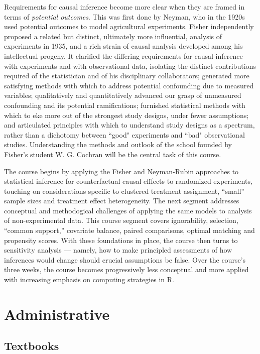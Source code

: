 \documentclass[12pt]{article}
\begin{document}
Requirements for causal inference become more clear when they are framed in terms of \emph{potential outcomes}.  This was first done by Neyman, who in the 1920s used potential outcomes to model agricultural experiments.  Fisher independently proposed a related but distinct, ultimately more influential, analysis of experiments in 1935, and a rich strain of causal analysis developed among his intellectual progeny. It clarified the differing requirements for causal inference with experiments and with observational data, isolating the distinct
contributions required of the statistician and of his disciplinary collaborators; generated more satisfying methods with which to address potential confounding due to measured variables; qualitatively and quantitatively advanced our grasp of unmeasured confounding and its potential ramifications; furnished statistical methods with which to eke more out of the strongest study designs, under fewer assumptions; and articulated principles with which to understand study designs as a spectrum, rather than a dichotomy between ``good" experiments and ``bad" observational studies. Understanding the methods and outlook of the school founded by Fisher's student W. G. Cochran will be the central task of this course.

The course begins by applying the Fisher and Neyman-Rubin approaches to statistical inference for counterfactual causal efffects to randomized experiments, touching on considerations
specific to clustered treatment assignment, ``small'' sample sizes and treatment effect heterogeneity. The next segment addresses conceptual and methodogical challenges of applying the same models to analysis of non-experimental data. This course segment covers ignorability, selection, ``common support,'' covariate balance, paired comparisons,
optimal matching and propensity scores. With these foundations in place, the course then turns to sensitivity analysis --- namely, how to make principled assessments of how inferences would change should crucial assumptions be false. Over the course's three weeks, the course becomes
progressively less conceptual and more applied with increasing
emphasis on computing strategies in R.

\section*{Administrative}

\subsection*{Textbooks}
\end{document}
